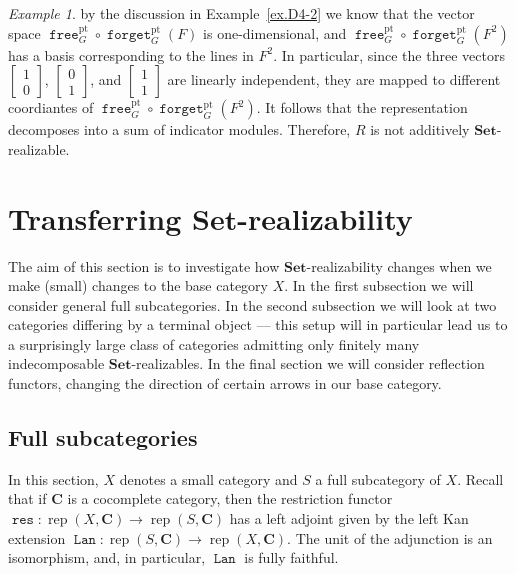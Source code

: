 \documentclass[a4paper]{amsart}
\theoremstyle{plain}
\theoremstyle{definition}
\theoremstyle{remark}
\newtheorem{example}[theorem]{Example}
\newcommand{\funct}[1]{\operatorname{\mathtt{#1}}}
\newcommand{\Set}{\mathbf{Set}}
\DeclareMathOperator{\rep}{rep}
\begin{document}
\begin{example}
by the discussion in Example~\ref{ex.D4-2} we know that the vector space \( \funct{free}^\mathrm{pt}_G \circ\funct{forget}^\mathrm{pt}_G (F) \) is one-dimensional, and \( \funct{free}^\mathrm{pt}_G \circ \funct{forget}^\mathrm{pt}_G (F^2) \) has a basis corresponding to the lines in $F^2$. In particular, since the three vectors \( \left[ \begin{smallmatrix} 1 \\ 0 \end{smallmatrix} \right] \), \( \left[ \begin{smallmatrix} 0 \\ 1 \end{smallmatrix} \right] \), and \( \left[ \begin{smallmatrix} 1 \\ 1 \end{smallmatrix} \right] \) are linearly independent, they are mapped to different coordiantes of \( \funct{free}^\mathrm{pt}_G \circ \funct{forget}^\mathrm{pt}_G (F^2) \). It follows that the representation decomposes into a sum of indicator modules. Therefore, $R$ is not additively $\Set$-realizable.
\end{example}

\section{Transferring \texorpdfstring{\( \Set \)}{Set}-realizability}
\label{sec:transfer}

The aim of this section is to investigate how \( \Set \)-realizability changes when we make (small) changes to the base category \( X \). In the first subsection we will consider general full subcategories. In the second subsection we will look at two categories differing by a terminal object --- this setup will in particular lead us to a surprisingly large class of categories admitting only finitely many indecomposable \( \Set \)-realizables. In the final section we will consider reflection functors, changing the direction of certain arrows in our base category.

\subsection{Full subcategories}
\label{sec:fullsubcat}
In this section, $X$ denotes a small category and $S$ a full subcategory of $X$. Recall that if $\mathbf{C}$ is a cocomplete category, then the restriction functor $\funct{res}\colon \rep(X, \mathbf{C}) \to \rep(S, \mathbf{C})$ has a left adjoint given by the left Kan extension $\funct{Lan}\colon\rep(S, \mathbf{C})\to \rep(X, \mathbf{C})$. The unit of the adjunction is an isomorphism, and, in particular, $\funct{Lan}$ is fully faithful. 
\end{document}
